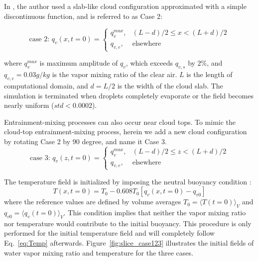 \documentclass[draft,jgrga]{AGUTeX}
\newcommand{\Eq}[1]{Eq.~\eqref{#1}} \newcommand{\Fig}[1]{Figure~\ref{#1}}
\begin{document}
\begin{article}
In \cite{Kumar11}, the author used a slab-like cloud configuration approximated with a simple discontinuous function, and is referred to as Case 2:

\begin{equation}
\mbox{case 2: } q_v(x,t=0) = 
\left\{\begin{array}{lr}
q_v^{max}, & (L-d)/2 \le x < (L+d)/2\\
q_{v,e}, & \mbox{elsewhere}
\end{array}\right.\label{case2}
\end{equation}

where $q_v^{max}$ is maximum amplitude of $q_v$, which exceeds $q_{v,s}$ by $2\%$, and $q_{v,e} = 0.03g/kg$ is the vapor mixing ratio of the clear air. $L$ is the length of computational domain, and $d = L/2$ is the width of the cloud slab. The simulation is terminated when droplets completely evaporate or the field becomes nearly uniform ($std<0.0002$).

Entrainment-mixing processes can also occur near cloud tops. To mimic the cloud-top entrainment-mixing process, herein we add a new cloud configuration by rotating Case 2 by $90$ degree, and name it Case 3.
\begin{equation}
\mbox{case 3: } q_v(z,t=0) = 
\left\{\begin{array}{lr}
q_v^{max}, & (L-d)/2 \le z < (L+d)/2\\
q_{v,e}, & \mbox{elsewhere}
\end{array}\right.\label{case3}
\end{equation}

The temperature field is initialized by imposing the neutral buoyancy condition \cite{Kumar14}:
\begin{equation}
T(x,t = 0) = T_0 - 0.608T_0[q_v(x,t = 0) - q_{v0}]
\end{equation}
where the reference values are defined by volume averages $T_0 = \langle T(t=0)\rangle_V$ and $q_{v0} = \langle q_v(t=0)\rangle_V$. This condition implies that neither the vapor mixing ratio nor temperature would contribute to the initial buoyancy. This procedure is only performed for the initial temperature field and will completely follow \Eq{eq:Temp} afterwards. \Fig{fig:slice_case123} illustrates the initial fields of water vapor mixing ratio and temperature for the three cases.


\end{article}
\end{document}
